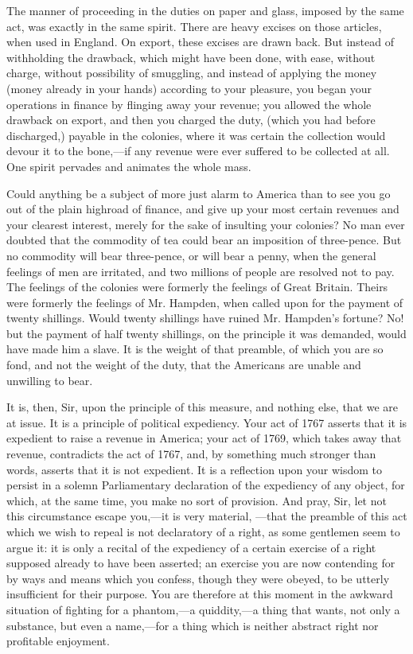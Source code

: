 The manner of proceeding in the duties on paper and glass, imposed by the same act, was exactly in the same spirit. There are heavy excises on those articles, when used in England. On export, these excises are drawn back. But instead of withholding the drawback, which might have been done, with ease, without charge, without possibility of smuggling, and instead of applying the money (money already in your hands) according to your pleasure, you began your operations in finance by flinging away your revenue; you allowed the whole drawback on export, and then you charged the duty, (which you had before discharged,) payable in the colonies, where it was certain the collection would devour it to the bone,—if any revenue were ever suffered to be collected at all. One spirit pervades and animates the whole mass.

Could anything be a subject of more just alarm to America than to see you go out of the plain highroad of finance, and give up your most certain revenues and your clearest interest, merely for the sake of insulting your colonies? No man ever doubted that the commodity of tea could bear an imposition of three-pence. But no commodity will bear three-pence, or will bear a penny, when the general feelings of men are irritated, and two millions of people are resolved not to pay. The feelings of the colonies were formerly the feelings of Great Britain. Theirs were formerly the feelings of Mr. Hampden, when called upon for the payment of twenty shillings. Would twenty shillings have ruined Mr. Hampden's fortune? No! but the payment of half twenty shillings, on the principle it was demanded, would have made him a slave. It is the weight of that preamble, of which you are so fond, and not the weight of the duty, that the Americans are unable and unwilling to bear.

It is, then, Sir, upon the principle of this measure, and nothing else, that we are at issue. It is a principle of political expediency. Your act of 1767 asserts that it is expedient to raise a revenue in America; your act of 1769, which takes away that revenue, contradicts the act of 1767, and, by something much stronger than words, asserts that it is not expedient. It is a reflection upon your wisdom to persist in a solemn Parliamentary declaration of the expediency of any object, for which, at the same time, you make no sort of provision. And pray, Sir, let not this circumstance escape you,—it is very material, —that the preamble of this act which we wish to repeal is not declaratory of a right, as some gentlemen seem to argue it: it is only a recital of the expediency of a certain exercise of a right supposed already to have been asserted; an exercise you are now contending for by ways and means which you confess, though they were obeyed, to be utterly insufficient for their purpose. You are therefore at this moment in the awkward situation of fighting for a phantom,—a quiddity,—a thing that wants, not only a substance, but even a name,—for a thing which is neither abstract right nor profitable enjoyment.


